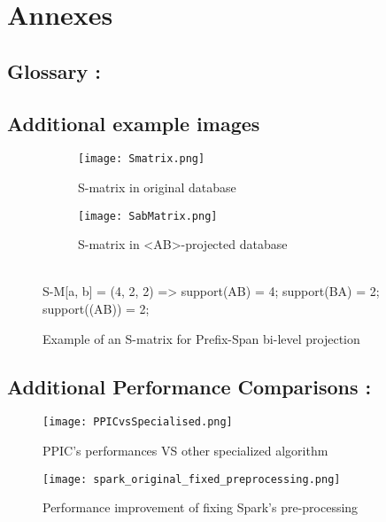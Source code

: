 \documentclass{eplmastersthesis}
\begin{document}
\clearpage
\nocite{*}



\clearpage
\section{Annexes}

\subsection{Glossary :}

\vspace*{-1.8cm}
\glsaddall
\printglossary[title=,type=\acronymtype]

\subsection{Additional example images}

\begin{figure*}[h]
  \centering
  \begin{subfigure}[t]{0.5\textwidth}
  	\centering
    \texttt{[image: Smatrix.png]}
    \caption{S-matrix in original database}
  \end{subfigure}
  \begin{subfigure}[t]{0.49\textwidth}
  	\centering
    \texttt{[image: SabMatrix.png]}
    \caption{S-matrix in <AB>-projected database}
  \end{subfigure}
  \vspace{5px} \\
  S-M[a, b] = (4, 2, 2) => support(AB) = 4; support(BA) = 2; support((AB)) = 2;
  \caption{Example of an S-matrix for Prefix-Span bi-level projection}
  \label{fig:smatrix}
\end{figure*}

\subsection{Additional Performance Comparisons :}

\begin{figure}[h]
  \centering
  \texttt{[image: PPICvsSpecialised.png]}
  \caption{PPIC's performances VS other specialized algorithm}
  \label{fig:PPICvsOther}
\end{figure}

\begin{figure}[h]
  \centering
  \texttt{[image: spark\_original\_fixed\_preprocessing.png]}
  \caption{Performance improvement of fixing Spark's pre-processing}
  \label{fig:spark_preprocessing_fix}
\end{figure}
\end{document}
